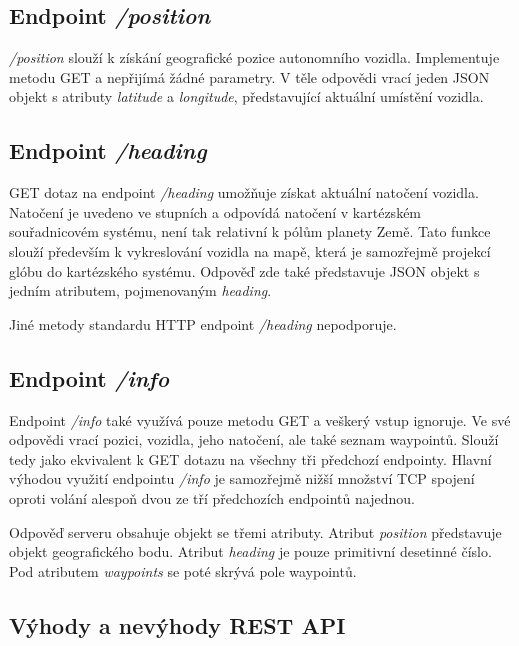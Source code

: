 \documentclass[czech, bachelor]{diploma}
\begin{document}
\subsection{Endpoint \emph{/position}}

\emph{/position} slouží k získání geografické pozice autonomního vozidla. Implementuje metodu GET a nepřijímá žádné parametry.
V těle odpovědi vrací jeden JSON objekt s atributy \emph{latitude} a \emph{longitude}, představující aktuální umístění vozidla.

\subsection{Endpoint \emph{/heading}}

GET dotaz na endpoint \emph{/heading} umožňuje získat aktuální natočení vozidla. Natočení je uvedeno ve stupních a odpovídá
natočení v kartézském souřadnicovém systému, není tak relativní k pólům planety Země. Tato funkce slouží především k vykreslování
vozidla na mapě, která je samozřejmě projekcí glóbu do kartézského systému. Odpověď zde také představuje JSON objekt s jedním
atributem, pojmenovaným \emph{heading}.

Jiné metody standardu HTTP endpoint \emph{/heading} nepodporuje.

\subsection{Endpoint \emph{/info}}

Endpoint \emph{/info} také využívá pouze metodu GET a veškerý vstup ignoruje. Ve své odpovědi vrací pozici, vozidla, jeho
natočení, ale také seznam waypointů. Slouží tedy jako ekvivalent k GET dotazu na všechny tři předchozí endpointy. Hlavní výhodou
využití endpointu \emph{/info} je samozřejmě nižší množství TCP spojení oproti volání alespoň dvou ze tří předchozích endpointů
najednou.

Odpověď serveru obsahuje objekt se třemi atributy. Atribut \emph{position} představuje objekt geografického bodu. Atribut
\emph{heading} je pouze primitivní desetinné číslo. Pod atributem \emph{waypoints} se poté skrývá pole waypointů.

\subsection{Výhody a nevýhody REST API}
\end{document}
